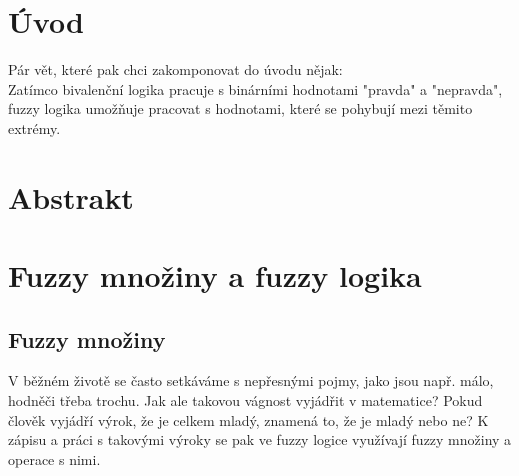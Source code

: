 


\newtheorem{definition}{Definice}
\newtheorem{remark}{Pozn\'amka}
\newtheorem{example}{Příklad}
\newtheorem{graph}{Obr\' azek}
\newcommand{\comment}[1]{}

\chapter{Úvod}

\color{blue} Pár vět, které pak chci zakomponovat do \'uvodu nějak:
                \\ 
                \color{black} Zatímco bivalenční logika pracuje s binárními hodnotami "pravda" a "nepravda", fuzzy logika umožňuje pracovat s hodnotami, které se pohybují mezi těmito extrémy.


\chapter{Abstrakt}
\label{abstrakt}




\chapter {Fuzzy mno\v ziny a fuzzy logika}
\section{Fuzzy mno\v ziny} 

\comment{
V klasické i fuzzy logice se často setkáváme se základními pojmy množina a prvek množiny. Množina se obecně vysvětluje jako souhrn, soubor nebo skupina objektů. Tyto objekty pak nazýváme prvky dané množiny. Nejvíce charakteristická vlastnost množin je, že je jednoznačně určena svými prvky, ale ignoruje jejich pořadí a další jejich struktury. Množina, která neobsahuje žádné prvky, se nazývá prázdná množina.
}

V běžném životě se často setkáváme s nepřesnými pojmy, jako jsou např. \clqq málo\crqq, \clqq hodně\crqq \space či třeba \clqq trochu\crqq \space. Jak ale takovou vágnost vyjádřit v matematice? Pokud člověk vyjádří výrok, že je \clqq celkem mladý\crqq, znamená to, že je mladý nebo ne? K zápisu a práci s takovými výroky se pak ve fuzzy logice využívají fuzzy množiny a operace s nimi.

